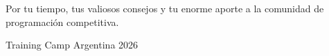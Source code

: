 \documentclass{beamer}
\begin{document}
\begin{frame}{}
    \centering
    \Huge{}
    
    \vspace{1.2cm}
    \large
    Por tu tiempo, tus valiosos consejos y tu enorme aporte a la comunidad de programación competitiva.
    
    \vspace{1.0cm}
    \small
    Training Camp Argentina 2026
\end{frame}
\end{document}
